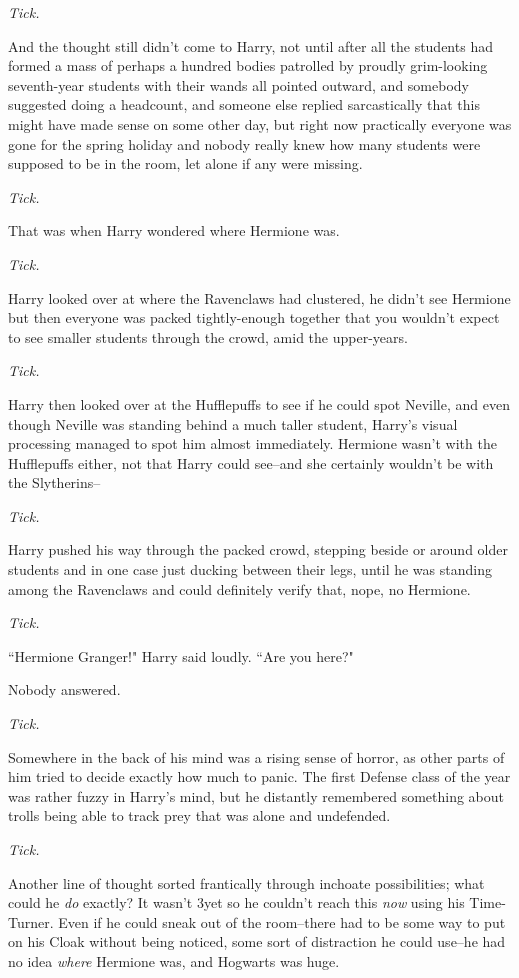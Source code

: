 \emph{Tick.}

And the thought still didn't come to Harry, not until after all the students had formed a mass of perhaps a hundred bodies patrolled by proudly grim-looking seventh-year students with their wands all pointed outward, and somebody suggested doing a headcount, and someone else replied sarcastically that this might have made sense on some other day, but right now practically everyone was gone for the spring holiday and nobody really knew how many students were supposed to be in the room, let alone if any were missing.

\emph{Tick.}

That was when Harry wondered where Hermione was.

\emph{Tick.}

Harry looked over at where the Ravenclaws had clustered, he didn't see Hermione but then everyone was packed tightly-enough together that you wouldn't expect to see smaller students through the crowd, amid the upper-years.

\emph{Tick.}

Harry then looked over at the Hufflepuffs to see if he could spot Neville, and even though Neville was standing behind a much taller student, Harry's visual processing managed to spot him almost immediately. Hermione wasn't with the Hufflepuffs either, not that Harry could see\---and she certainly wouldn't be with the Slytherins\---

\emph{Tick.}

Harry pushed his way through the packed crowd, stepping beside or around older students and in one case just ducking between their legs, until he was standing among the Ravenclaws and could definitely verify that, nope, no Hermione.

\emph{Tick.}

``Hermione Granger!" Harry said loudly. ``Are you here?"

Nobody answered.

\emph{Tick.}

Somewhere in the back of his mind was a rising sense of horror, as other parts of him tried to decide exactly how much to panic. The first Defense class of the year was rather fuzzy in Harry's mind, but he distantly remembered something about trolls being able to track prey that was alone and undefended.

\emph{Tick.}

Another line of thought sorted frantically through inchoate possibilities; what could he \emph{do} exactly? It wasn't 3\pm yet so he couldn't reach this \emph{now} using his Time-Turner. Even if he could sneak out of the room\---there had to be some way to put on his Cloak without being noticed, some sort of distraction he could use\---he had no idea \emph{where} Hermione was, and Hogwarts was huge.

